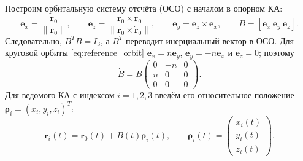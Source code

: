 \documentclass[a4paper,12pt]{article}
\begin{document}
Построим орбитальную систему отсчёта (ОСО) с началом в опорном КА:
\begin{equation}
 \mathbf e_x=\frac{\mathbf r_0}{\|\mathbf r_0\|},\qquad
 \mathbf e_z=\frac{\mathbf r_0\times\dot{\mathbf r}_0}
                   {\|\mathbf r_0\times\dot{\mathbf r}_0\|},\qquad
 \mathbf e_y=\mathbf e_z\times\mathbf e_x,\qquad
 B=[\mathbf e_x\ \mathbf e_y\ \mathbf e_z].
 \label{eq:orbital_basis}
\end{equation}
Следовательно, $B^TB=I_3$, а $B^T$ переводит инерциальный вектор в ОСО.
Для круговой орбиты \eqref{eq:reference_orbit}
$\dot{\mathbf e}_x=n\mathbf e_y$,
$\dot{\mathbf e}_y=-n\mathbf e_x$ и $\dot{\mathbf e}_z=0$; поэтому
\begin{equation}
 \dot B=B
 \begin{pmatrix}0&-n&0\\n&0&0\\0&0&0\end{pmatrix}.
 \label{eq:basis_derivative}
\end{equation}
Для ведомого КА с индексом $i=1,2,3$ введём его относительное
положение $\boldsymbol\rho_i=(x_i,y_i,z_i)^T$:
\begin{equation}
    \mathbf r_i(t)=\mathbf r_0(t)+B(t)\boldsymbol\rho_i(t),
    \qquad
    \boldsymbol\rho_i(t)=
    \begin{pmatrix}x_i(t)\\y_i(t)\\z_i(t)\end{pmatrix}.
    \label{eq:relative_position}
\end{equation}
\end{document}
